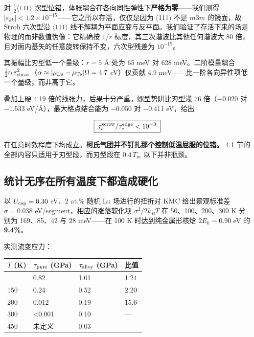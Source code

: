 对 \(\tfrac12\langle111\rangle\) 螺型位错，体胀耦合在各向同性弹性下\textbf{严格为零}------我们测得 \(|\varepsilon_{kk}| < 1.2\times10^{-15}\)------它之所以存活，仅仅是因为 (111) 不是 \(m\bar3m\) 的镜面，故 Stroh 六次型沿 \(\langle111\rangle\) 线不解耦为平面应变与反平面。我们验证了存活下来的场是物理的而非数值伪像：它精确按 \(1/r\) 标度，其三次谐波比其他任何谐波大 80 倍，且对面内基矢的任意旋转保持不变，六次型残差为 \(10^{-15}\)。

其振幅比刃型低一个量级：\(r = 5\) Å 处为 65 meV 对 628 meV。二阶模量耦合 \(\tfrac12\alpha\,\varepsilon_{\rm shear}^2\)（\(\alpha\approx|\mu_{\rm Lu}-\mu_{\rm Ta}|\Omega = 4.7\) eV）仅贡献 4.9 meV------比一阶各向异性项低一个量级，而非高于它。

叠加上硬 4.19 倍的线张力，后果十分严重。螺型势阱比刃型浅 76 倍（−0.020 对 −1.533 eV/Å），最大格点结合能为 −0.050 对 −0.411 eV，给出

\[\boxed{\;\tau_c^{\rm screw}/\tau_c^{\rm edge} < 10^{-3}\;}\]

在任意时效程度下均成立。\textbf{柯氏气团并不钉扎那个控制低温屈服的位错。} 4.1 节的全部内容只适用于刃型段，而刃型段在 \(0.4\,T_m\) 以下并非瓶颈。

\hypertarget{ux7edfux8ba1ux65e0ux5e8fux5728ux6240ux6709ux6e29ux5ea6ux4e0bux90fdux9020ux6210ux786cux5316}{%
\subsection{统计无序在所有温度下都造成硬化}\label{sec:ux7edfux8ba1ux65e0ux5e8fux5728ux6240ux6709ux6e29ux5ea6ux4e0bux90fdux9020ux6210ux786cux5316}}

以 \(U_{\rm cap} = 0.30\) eV、2 at.\% 随机 Lu 场进行的扭折对 KMC 给出景观标准差 \(\sigma = 0.038\) eV/segment，相应的涨落软化项 \(\sigma^2/2k_BT\) 在 50、100、200、300 K 分别为 169、85、42 与 28 meV------在 100 K 时达到纯金属形核焓 \(2E_k = 0.90\) eV 的 \textbf{9.4\%}。

实测流变应力：

\begin{longtable}[]{@{}llll@{}}
\toprule\noalign{}
\(T\) (K) & \(\tau_{\rm pure}\) (GPa) & \(\tau_{\rm alloy}\) (GPa) & 比值 \\
\midrule\noalign{}
\endhead
\bottomrule\noalign{}
\endlastfoot
100 & 0.82 & 1.01 & 1.24 \\
150 & 0.24 & 0.52 & 2.20 \\
200 & 0.012 & 0.19 & 15.6 \\
300 & \textless0.001 & 0.10 & --- \\
450 & 未定义 & 0.03 & --- \\
\end{longtable}

